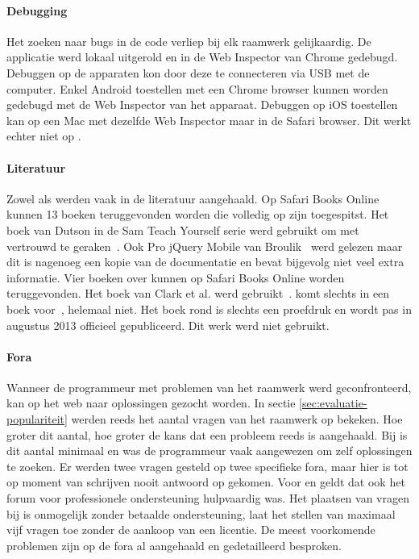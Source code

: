 \paragraph{Debugging}
Het zoeken naar bugs in de code verliep bij elk raamwerk gelijkaardig.
De applicatie werd lokaal uitgerold en in de Web Inspector van Chrome gedebugd.
Debuggen op de apparaten kon door deze te connecteren via USB met de computer.
Enkel Android toestellen met een Chrome browser kunnen worden gedebugd met de Web Inspector van het apparaat.
Debuggen op iOS toestellen kan op een Mac met dezelfde Web Inspector maar in de Safari browser.
Dit werkt echter niet op \ipadi{}.

\paragraph{Literatuur}
Zowel \jqm{} als \st{} werden vaak in de literatuur aangehaald.
Op Safari Books Online kunnen 13 boeken teruggevonden worden die volledig op \jqm{} zijn toegespitst.
Het boek van Dutson in de Sam Teach Yourself serie werd gebruikt om met \jqm{} vertrouwd te geraken~\cite{PhilDutson2012}.
Ook Pro jQuery Mobile van Broulik~\cite{Broulik2012} werd gelezen maar dit is nagenoeg een kopie van de documentatie en bevat bijgevolg niet veel extra informatie.
Vier boeken over \st{} kunnen op Safari Books Online worden teruggevonden.
Het boek van Clark et al. werd gebruikt~\cite{JohnEClark2012}.
\kendo{} komt slechts in een boek voor~\cite{Bhandari2013},  \lungo{} helemaal niet.
Het boek rond \kendo{} is slechts een proefdruk en wordt pas in augustus 2013 officieel gepubliceerd.
Dit werk werd niet gebruikt.


\paragraph{Fora}
Wanneer de programmeur met problemen van het raamwerk werd geconfronteerd, kan op het web naar oplossingen gezocht worden.
In sectie \ref{sec:evaluatie-populariteit} werden reeds het aantal vragen van het raamwerk op \so{} bekeken.
Hoe groter dit aantal,  hoe groter de kans dat een probleem reeds is aangehaald.
Bij \lungo{} is dit aantal minimaal en was de programmeur vaak aangewezen om zelf oplossingen te zoeken.
Er werden twee vragen gesteld op twee specifieke fora, maar hier is tot op moment van schrijven nooit antwoord op gekomen.
Voor \st{} en \kendo{} geldt dat ook het forum voor professionele ondersteuning hulpvaardig was.
Het plaatsen van vragen bij \st{} is onmogelijk zonder betaalde ondersteuning,  \kendo{} laat het stellen van maximaal vijf vragen toe zonder de aankoop van een licentie.
De meest voorkomende problemen zijn op de fora al aangehaald en gedetailleerd besproken.


